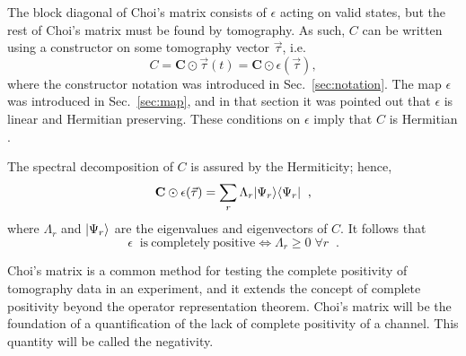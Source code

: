 The block diagonal of Choi's matrix consists of $\epsilon$ acting on valid states, but the rest of Choi's matrix must be found by tomography.  As such, $C$ can be written using a constructor on some tomography vector $\vec{\tau}$, i.e.\
$$
C = \mathbf{C}\odot\vec{\tau}(t) = \mathbf{C}\odot\epsilon\left(\vec{\tau}\right),
$$
where the constructor notation was introduced in Sec.\ \ref{sec:notation}.  The map $\epsilon$ was introduced in Sec.\ \ref{sec:map}, and in that section it was pointed out that $\epsilon$ is linear and Hermitian preserving.   These conditions on $\epsilon$ imply that $C$ is Hermitian \cite{Choi1975,Shaji2005}.

The spectral decomposition of $C$ is assured by the Hermiticity; hence,
$$
\mathbf{C}\odot\epsilon(\vec{\tau}) = \sum_r \Lambda_r |\Psi_r\rangle\langle\Psi_r|\;\;,
$$
where $\Lambda_r$ and $\left|\Psi_r\right\rangle$ are the eigenvalues and eigenvectors of $C$.  It follows that 
$$
\epsilon\;\;\mathrm{is\ completely\ positive}\Leftrightarrow\Lambda_r\ge 0\;\forall r\;\;.
$$  

Choi's matrix is a common method for testing the complete positivity of tomography data in an experiment, and it extends the concept of complete positivity beyond the operator representation theorem.  Choi's matrix will be the foundation of a quantification of the lack of complete positivity of a channel.  This quantity will be called the negativity.

